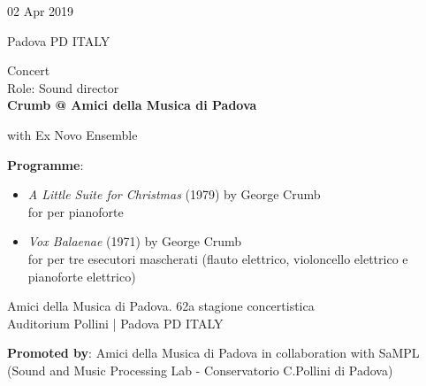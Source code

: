\documentclass[7pt,a4paper]{article}
\begin{document}
\begin{mdframed}[
    backgroundcolor=white,
    linecolor=white,
    linewidth=0pt,
    innerleftmargin=6pt,
    innerrightmargin=6pt,
    innertopmargin=6pt,
    innerbottommargin=6pt,
    skipabove=0pt,
    skipbelow=0pt
]

\begin{minipage}[t]{0.28\textwidth}

02 Apr 2019

\scriptsize Padova PD ITALY


\end{minipage}
\begin{minipage}[t]{0.68\textwidth}
\small Concert
\\\scriptsize Role: Sound director
\\ \normalsize \textbf{Crumb @ Amici della Musica di Padova}

\par\scriptsize with Ex Novo Ensemble
\vspace{0.25cm}

\par \scriptsize \textbf{Programme}:\par
\begin{itemize}

\item \textit{A Little Suite for Christmas} (1979) by George Crumb\\ for per pianoforte

\item \textit{Vox Balaenae} (1971) by George Crumb\\ for per tre esecutori mascherati (flauto elettrico, violoncello elettrico e pianoforte elettrico)

\end{itemize}
\vspace{0.2cm}



\small Amici della Musica di Padova. 62a stagione concertistica\\Auditorium Pollini | \scriptsize Padova PD ITALY

\vspace{0.1cm}
\scriptsize

\vspace{0.1cm}
\par \textbf{Promoted by}: Amici della Musica di Padova in collaboration with SaMPL (Sound and Music Processing Lab - Conservatorio C.Pollini di Padova)
\end{minipage}
\vspace{0.25cm}
\end{mdframed}
\end{document}

